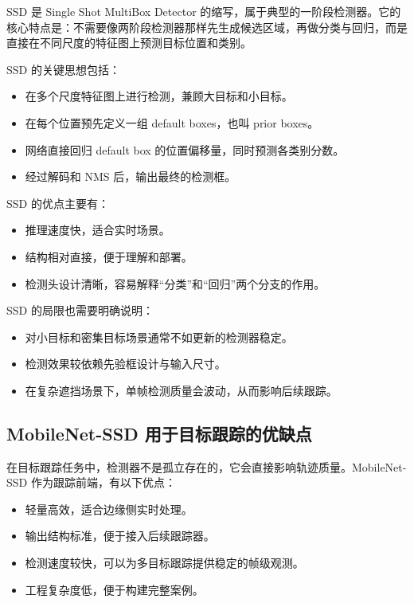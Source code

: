 SSD 是 Single Shot MultiBox Detector
的缩写，属于典型的一阶段检测器。它的核心特点是：不需要像两阶段检测器那样先生成候选区域，再做分类与回归，而是直接在不同尺度的特征图上预测目标位置和类别。

SSD 的关键思想包括：

\begin{itemize}
\tightlist
\item
  在多个尺度特征图上进行检测，兼顾大目标和小目标。
\item
  在每个位置预先定义一组 default boxes，也叫 prior boxes。
\item
  网络直接回归 default box 的位置偏移量，同时预测各类别分数。
\item
  经过解码和 NMS 后，输出最终的检测框。
\end{itemize}

SSD 的优点主要有：

\begin{itemize}
\tightlist
\item
  推理速度快，适合实时场景。
\item
  结构相对直接，便于理解和部署。
\item
  检测头设计清晰，容易解释``分类''和``回归''两个分支的作用。
\end{itemize}

SSD 的局限也需要明确说明：

\begin{itemize}
\tightlist
\item
  对小目标和密集目标场景通常不如更新的检测器稳定。
\item
  检测效果较依赖先验框设计与输入尺寸。
\item
  在复杂遮挡场景下，单帧检测质量会波动，从而影响后续跟踪。
\end{itemize}

\subsection{MobileNet-SSD
用于目标跟踪的优缺点}\label{src-experiment-case2-h16}

在目标跟踪任务中，检测器不是孤立存在的，它会直接影响轨迹质量。MobileNet-SSD
作为跟踪前端，有以下优点：

\begin{itemize}
\tightlist
\item
  轻量高效，适合边缘侧实时处理。
\item
  输出结构标准，便于接入后续跟踪器。
\item
  检测速度较快，可以为多目标跟踪提供稳定的帧级观测。
\item
  工程复杂度低，便于构建完整案例。
\end{itemize}

